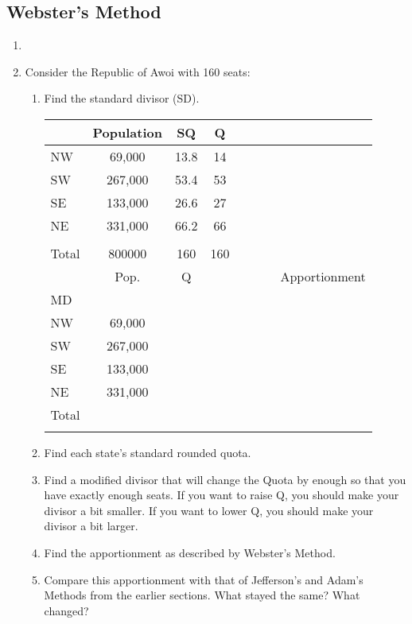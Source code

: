 	\subsection{Webster's Method} 
\begin{enumerate}
	\item 	   {}
	\vfill
	\item Consider the Republic of Awoi with 160 seats:
		\begin{enumerate}
		\item Find the standard divisor (SD).
		
		
		\begin{tabular}{l|c|c|c|c|c|c|c} \hline \ifsolns
		 & Population & SQ & Q
\\\hline NW  & 69,000 & 13.8 & 14
\\\hline SW  & 267,000 & 53.4 & 53
\\\hline SE  & 133,000 & 26.6 & 27
\\\hline NE  & 331,000 & 66.2 & 66
\\\hline &  &  & 
\\\hline Total  & 800000 & 160 & 160 \\\hline
\else
	&	Pop. &	\hspace{.75cm}Q& \hspace{.75cm} 	& \hspace{.75cm}	& \hspace{.75cm} 	&\hspace{.75cm} 	&  	 	Apportionment \\\hline
MD	&&&&&&&\\\hline
	 NW &	69,000	&&&&&&\\\hline			
	 SW &	267,000	&&&&&&\\\hline			
	 SE &	133,000				&&&&&&\\\hline
	 NE &	 331,000 &&&&&&\\\hline
	 Total & &&&&&&\\\hline \fi
	\end{tabular}
	
	\normalsize
		\item Find each state's standard rounded quota. 
		\item Find a modified divisor that will change the Quota by enough so that you have exactly enough seats.  If you want to raise Q, you should make your divisor a bit smaller.  If you want to lower Q, you should make your divisor a bit larger.
		\item Find the apportionment as described by Webster's Method.
		\item Compare this apportionment with that of Jefferson's and Adam's Methods from the earlier sections.  What stayed the same?  What changed?
	\end{enumerate} \vfill
	

\end{enumerate}
